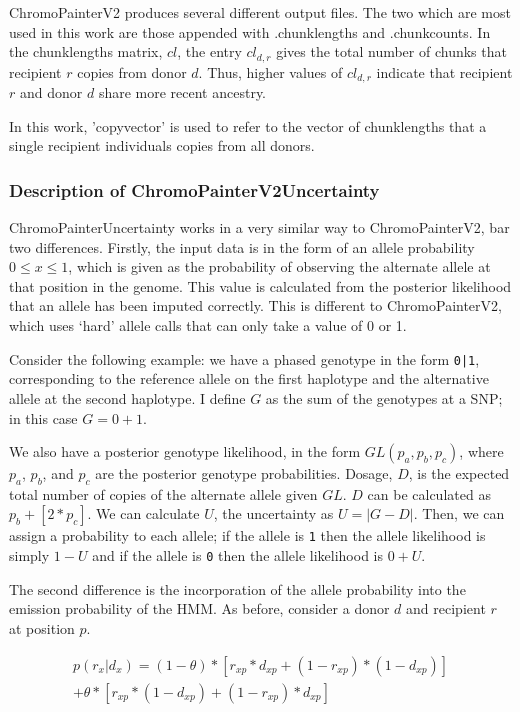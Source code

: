 ChromoPainterV2 produces several different output files. The two which are most used in this work are those appended with .chunklengths and .chunkcounts. In the chunklengths matrix, $cl$, the entry $cl_{d,r}$ gives the total number of chunks that recipient $r$ copies from donor $d$. Thus, higher values of $cl_{d,r}$ indicate that recipient $r$ and donor $d$ share more recent ancestry. 

In this work, 'copyvector' is used to refer to the vector of chunklengths that a single recipient individuals copies from all donors.

\subsubsection{Description of ChromoPainterV2Uncertainty}

ChromoPainterUncertainty works in a very similar way to ChromoPainterV2, bar two differences. Firstly, the input data is in the form of an allele probability $0 \leq x \leq 1$, which is given as the probability of observing the alternate allele at that position in the genome. This value is calculated from the posterior likelihood that an allele has been imputed correctly. This is different to ChromoPainterV2, which uses `hard' allele calls that can only take a value of 0 or 1.

Consider the following example: we have a phased genotype in the form \texttt{0|1}, corresponding to the reference allele on the first haplotype and the alternative allele at the second haplotype. I define $G$ as the sum of the genotypes at a SNP; in this case $G=0+1$.

We also have a posterior genotype likelihood, in the form $GL(p_{a}, p_{b}, p_{c})$, where $p_{a}$, $p_{b}$, and $p_{c}$ are the posterior genotype probabilities. Dosage, $D$, is the expected total number of copies of the alternate allele given $GL$. $D$ can be calculated as $p_{b} + [2*p_{c}]$. We can calculate $U$, the uncertainty as $U = |G-D|$. Then, we can assign a probability to each allele; if the allele is \texttt{1} then the allele likelihood is simply $1 - U$ and if the allele is \texttt{0} then the allele likelihood is $0 + U$.
                 
The second difference is the incorporation of the allele probability into the emission probability of the HMM. As before, consider a donor $d$ and recipient $r$ at position $p$.

\begin{equation}
\begin{split}
p(r_{x} | d_{x}) = (1-\theta)*[r_{xp}*d_{xp} + (1-r_{xp}) * (1-d_{xp})] \\ + \theta * [r_{xp}*(1-d_{xp}) + (1-r_{xp})*d_{xp}]
\end{split}
\end{equation}

